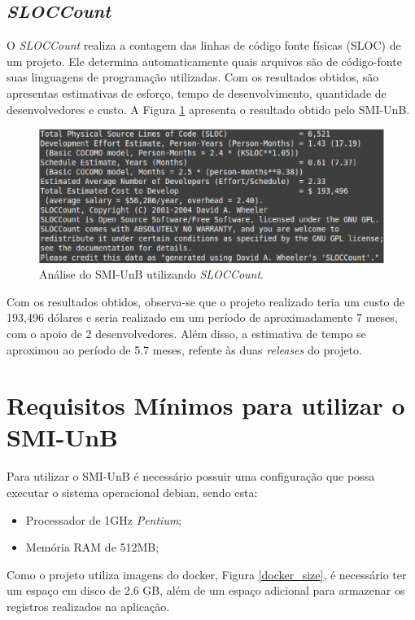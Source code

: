 \subsection{\textit{SLOCCount}}
O \textit{SLOCCount} realiza a contagem das linhas de código fonte físicas (SLOC) de um projeto. Ele determina automaticamente quais arquivos são de código-fonte suas linguagens de programação utilizadas. Com os resultados obtidos, são apresentas estimativas de esforço, tempo de desenvolvimento, quantidade de desenvolvedores e custo. A Figura \ref{sloc} apresenta o resultado obtido pelo SMI-UnB.

\begin{figure}[!h]
    \centering
    \includegraphics[keepaspectratio=true,scale=0.7]{figuras/sloc.eps}
    \caption{Análise do SMI-UnB utilizando \textit{SLOCCount}.}
    \label{sloc}
\end{figure}

Com os resultados obtidos, observa-se que o projeto realizado teria um custo de 193,496 dólares e seria realizado em um período de aproximadamente 7 meses, com o apoio de 2 desenvolvedores. Além disso, a estimativa de tempo se aproximou ao período de 5.7 meses, refente às duas \textit{releases} do projeto.

\section{Requisitos Mínimos para utilizar o SMI-UnB}
    Para utilizar o SMI-UnB é necessário possuir uma configuração que possa executar o sistema operacional debian, sendo esta:

    \begin{itemize}
        \item Processador de 1GHz \textit{Pentium};
        \item Memória RAM de 512MB;
    \end{itemize}

    Como o projeto utiliza imagens do docker, Figura \ref{docker_size}, é necessário ter um espaço em disco de 2.6 GB, além de um espaço adicional para armazenar os registros realizados na aplicação.


